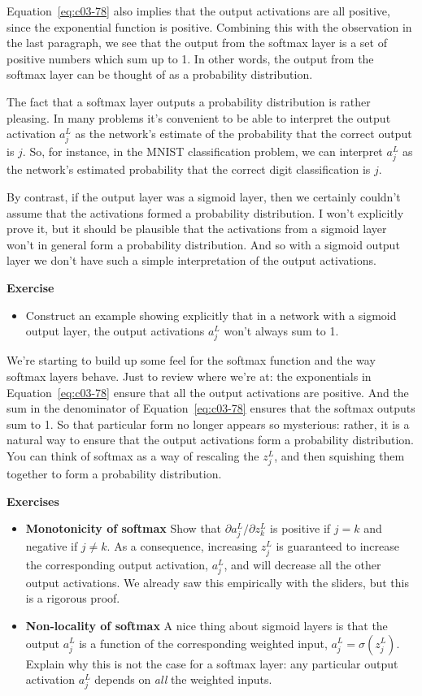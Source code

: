 Equation~\ref{eq:c03-78} also implies that the output activations are all positive, since the exponential function is positive. Combining this with the observation in the last paragraph, we see that the output from the softmax layer is a set of positive numbers which sum up to 1. In other words, the output from the softmax layer can be thought of as a probability distribution.

The fact that a softmax layer outputs a probability distribution is rather pleasing. In many problems it's convenient to be able to interpret the output activation $a^L_j$
as the network's estimate of the probability that the correct output is $j$. So, for instance, in the MNIST classification problem, we can interpret $a^L_j$ as the network's estimated probability that the correct digit classification is $j$.

By contrast, if the output layer was a sigmoid layer, then we certainly couldn't assume that the activations formed a probability distribution. I won't explicitly prove it, but it should be plausible that the activations from a sigmoid layer won't in general form a probability distribution. And so with a sigmoid output layer we don't have such a simple interpretation of the output activations.

\textbf{Exercise}

\begin{itemize}
\item Construct an example showing explicitly that in a network with a sigmoid output layer, the output activations $a^L_j$ won't always sum to 1.
\end{itemize}

We're starting to build up some feel for the softmax function and the way softmax layers behave. Just to review where we're at: the exponentials in Equation~\ref{eq:c03-78} ensure that all the output activations are positive. And the sum in the denominator of Equation~\ref{eq:c03-78} ensures that the softmax outputs sum to 1. So that particular form no longer appears so mysterious: rather, it is a natural way to ensure that the output activations form a probability distribution. You can think of softmax as a way of rescaling the $z_{j}^{L}$, and then squishing them together to form a probability distribution.

\textbf{Exercises}
\begin{itemize}
\item
\textbf{Monotonicity of softmax} Show that $\partial a_{j}^{L} / \partial z_{k}^{L}$ is positive if $j=k$ and negative if $j\neq k$. As a consequence, increasing $z_{j}^{L}$ is guaranteed to increase the corresponding output activation, $a^L_j$, and will decrease all the other output activations. We already saw this empirically with the sliders, but this is a rigorous proof.

\item
\textbf{Non-locality of softmax} A nice thing about sigmoid layers is that the output $a^L_j$ is a function of the corresponding weighted input, $a_{j}^{L}=\sigma\left(z_{j}^{L}\right)$. Explain why this is not the case for a softmax layer: any particular output activation $a^L_j$
depends on \textit{all} the weighted inputs. 
\end{itemize}

